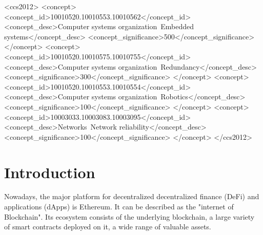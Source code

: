 \documentclass[a4paper,sigconf, language=french,
language=german, language=spanish, language=english]{acmart}
\begin{document}
\begin{CCSXML}
<ccs2012>
 <concept>
  <concept_id>10010520.10010553.10010562</concept_id>
  <concept_desc>Computer systems organization~Embedded systems</concept_desc>
  <concept_significance>500</concept_significance>
 </concept>
 <concept>
  <concept_id>10010520.10010575.10010755</concept_id>
  <concept_desc>Computer systems organization~Redundancy</concept_desc>
  <concept_significance>300</concept_significance>
 </concept>
 <concept>
  <concept_id>10010520.10010553.10010554</concept_id>
  <concept_desc>Computer systems organization~Robotics</concept_desc>
  <concept_significance>100</concept_significance>
 </concept>
 <concept>
  <concept_id>10003033.10003083.10003095</concept_id>
  <concept_desc>Networks~Network reliability</concept_desc>
  <concept_significance>100</concept_significance>
 </concept>
</ccs2012>
\end{CCSXML}






\maketitle

\section{Introduction}
Nowadays, the major platform for decentralized decentralized ﬁnance (DeFi) 
and applications (dApps) is Ethereum. It can be described as the "internet of Blockchain".
Its ecosystem consists of the underlying blockchain, a large
variety of smart contracts deployed on it, a wide range of
valuable assets. 
\end{document}
